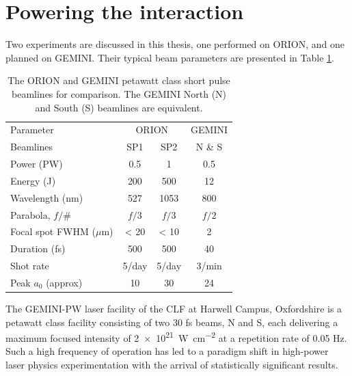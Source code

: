 \section{Powering the interaction}
Two experiments are discussed in this thesis, one performed on ORION, and one planned on GEMINI. Their typical beam parameters are presented in Table \ref{tab:laser_params}.
\begin{table}[]
	\centering
	\begin{tabular}{lccc}
		\hline \hline
		Parameter                & \multicolumn{2}{c}{ORION} & GEMINI \\ 
		Beamlines                & SP1         & SP2         & N \& S  \\ \hline
		Power (PW)               & 0.5         & 1           & 0.5    \\
		Energy (J)               & 200         & 500         & 12     \\
		Wavelength (nm)          & 527         & 1053        & 800    \\
		Parabola, $f/\#$ & $f/3$        & $f/3$        & $f/2$      \\
		Focal spot FWHM ($\mu$m) & < 20        & < 10        & 2      \\
		Duration (fs)            & 500         & 500         & 40     \\
		Shot rate                & 5/day       & 5/day       & 3/min  \\
		Peak $a_0$ (approx)      & 10          & 30          & 24    \\ \hline \hline
	\end{tabular}
	\caption{The ORION and GEMINI petawatt class short pulse beamlines for comparison. The GEMINI North (N) and South (S) beamlines are equivalent.}
	\label{tab:laser_params}
\end{table}
The GEMINI-PW laser facility of the \ac{CLF} at Harwell Campus, Oxfordshire is a petawatt class facility consisting of two 30 fs beams, \ac{N} and \ac{S}, each delivering a maximum focused intensity of \qty{2e21}{W.cm^{-2}} at a repetition rate of 0.05 Hz. Such a high frequency of operation has led to a paradigm shift in high-power laser physics experimentation with the arrival of statistically significant results.

